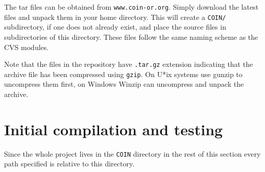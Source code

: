 The tar files can be obtained from {\tt www.coin-or.org}. Simply
download the latest files and unpack them in your home directory.
This will create a {\tt COIN/} subdirectory, if one does not already
exist, and place the source files in subdirectories of this directory.
These files follow the same naming scheme as the CVS modules.

Note that the files in the repository have {\tt .tar.gz} extension 
indicating that the archive file has been compressed using {\tt gzip}. On 
U*ix systems use gunzip to uncompress them first, on Windows Winzip can
uncompress and unpack the archive.

\section{Initial compilation and testing}

Since the whole project lives in the {\tt COIN} directory in the rest of this
section every path specified is relative to this directory.

